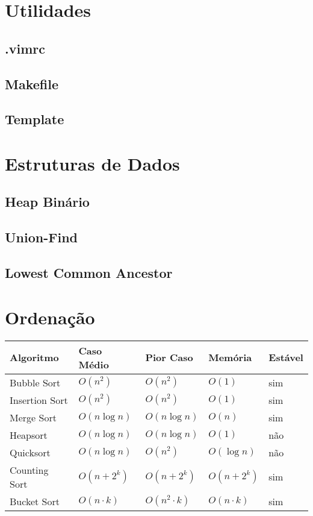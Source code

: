 \documentclass[12pt,a4paper]{article}
\begin{document}
	\twocolumn
	\tableofcontents
	\onecolumn

	\section{Utilidades}
		\subsection{.vimrc}
			
		\subsection{Makefile}
			
		\subsection{Template}
			
	
	\section{Estruturas de Dados}
		\subsection{Heap Binário}
			
		\subsection{Union-Find}
			
		\subsection{Lowest Common Ancestor}

	\section{Ordenação}
		\begin{tabular}{l l l l l}
			\bf{Algoritmo}	& \bf{Caso Médio}	& \bf{Pior Caso}	& \bf{Memória}	& \bf{Estável}	\\
			\hline
			Bubble Sort		& \(O(n^2)\)		& \(O(n^2)\)		& \(O(1)\)		& sim			\\
			Insertion Sort	& \(O(n^2)\)		& \(O(n^2)\)		& \(O(1)\)		& sim			\\
			Merge Sort		& \(O(n \log n)\)	& \(O(n \log n)\)	& \(O(n)\)		& sim			\\
			Heapsort		& \(O(n \log n)\)	& \(O(n \log n)\)	& \(O(1)\)		& não			\\
			Quicksort		& \(O(n \log n)\)	& \(O(n^2)\)		& \(O(\log n)\) & não			\\
			\hline
			Counting Sort	& \(O(n + 2^k)\)	& \(O(n + 2^k)\)	& \(O(n + 2^k)\) & sim			\\
			Bucket Sort		& \(O(n \cdot k)\)	& \(O(n^2\cdot k)\)	& \(O(n \cdot k)\) & sim			\\
		\end{tabular}
\end{document}
